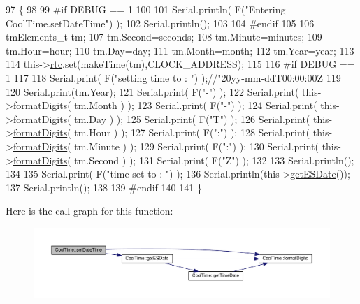 \begin{DoxyCode}
97 \{ 
98 
99 \textcolor{preprocessor}{#if DEBUG == 1}
100 
101     Serial.println( F(\textcolor{stringliteral}{"Entering CoolTime.setDateTime"}) );
102     Serial.println();
103 
104 \textcolor{preprocessor}{#endif}
105 
106     tmElements\_t tm;
107     tm.Second=seconds; 
108     tm.Minute=minutes; 
109     tm.Hour=hour; 
110     tm.Day=day;
111     tm.Month=month; 
112     tm.Year=year;
113     
114     this->\hyperlink{classCoolTime_abd38f2384ff90692b1568d9db869412e}{rtc}.set(makeTime(tm),CLOCK\_ADDRESS);   
115 
116 \textcolor{preprocessor}{#if DEBUG == 1}
117 
118     Serial.print( F(\textcolor{stringliteral}{"setting time to : "}) );\textcolor{comment}{//"20yy-mm-ddT00:00:00Z}
119 
120     Serial.print(tm.Year);
121     Serial.print( F(\textcolor{stringliteral}{"-"}) );
122     Serial.print( this->\hyperlink{classCoolTime_acd537cd4210d7bde4e1f5c47d2ac0456}{formatDigits}( tm.Month ) );
123     Serial.print( F(\textcolor{stringliteral}{"-"}) );
124     Serial.print( this->\hyperlink{classCoolTime_acd537cd4210d7bde4e1f5c47d2ac0456}{formatDigits}( tm.Day ) );
125     Serial.print( F(\textcolor{stringliteral}{"T"}) );
126     Serial.print( this->\hyperlink{classCoolTime_acd537cd4210d7bde4e1f5c47d2ac0456}{formatDigits}( tm.Hour ) );
127     Serial.print( F(\textcolor{stringliteral}{":"}) );
128     Serial.print( this->\hyperlink{classCoolTime_acd537cd4210d7bde4e1f5c47d2ac0456}{formatDigits}( tm.Minute ) );
129     Serial.print( F(\textcolor{stringliteral}{":"}) );
130     Serial.print( this->\hyperlink{classCoolTime_acd537cd4210d7bde4e1f5c47d2ac0456}{formatDigits}( tm.Second ) );
131     Serial.print( F(\textcolor{stringliteral}{"Z"}) );
132 
133     Serial.println();
134     
135     Serial.print( F(\textcolor{stringliteral}{"time set to : "}) );
136     Serial.println(this->\hyperlink{classCoolTime_ac4f32ee513c1328d984306645e8785a4}{getESDate}());
137     Serial.println();
138 
139 \textcolor{preprocessor}{#endif}
140 
141 \}
\end{DoxyCode}
Here is the call graph for this function\+:
\nopagebreak
\begin{figure}[H]
\begin{center}
\leavevmode
\includegraphics[width=350pt]{classCoolTime_ab81ea7fdaace111aa01cc1ec84c6d297_cgraph}
\end{center}
\end{figure}
\mbox{\label{classCoolTime_aae601f795452cfa48d9fb337aed483a8}} 
